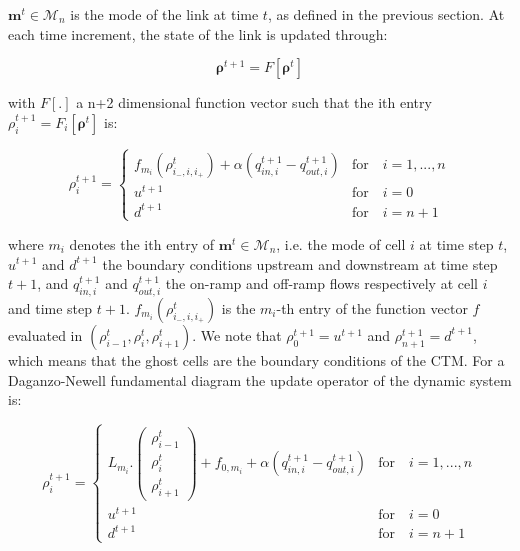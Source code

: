 \documentclass[11pt]{article}
\numberwithin{equation}{section}
\numberwithin{figure}{section}
\numberwithin{table}{section}
\begin{document}
\hspace{10mm}

$\boldsymbol m^{t}\in\mathcal{M}_{n}$ is the mode of the link at time $t$, as defined in the previous section. At each time increment, the state of the link is updated through:

\begin{equation}
\boldsymbol\rho^{t+1} = F[\boldsymbol\rho^{t}]
\label{eq:underlyingSystem1}
\end{equation}

\noindent with $F[.]$ a n+2 dimensional function vector such that the ith entry $\rho^{t+1}_{i}=F_{i}[\boldsymbol\rho^{t}]$ is:

\begin{equation}
\rho^{t+1}_{i} = \begin{cases}
f_{m_{i}}(\rho^{t}_{i_{-},i,i_{+}}) + \alpha(q^{t+1}_{in,i}-q^{t+1}_{out,i}) & \text{for}\quad i=1,...,n\\
u^{t+1} & \text{for}\quad i=0\\
d^{t+1} & \text{for}\quad i=n+1
\end{cases}
\label{eq:underlyingSystem2}
\end{equation}

\noindent where $m_{i}$ denotes the ith entry of $\boldsymbol m^{t} \in\mathcal{M}_{n}$, i.e. the mode of cell $i$ at time step $t$, $u^{t+1}$ and $d^{t+1}$ the boundary conditions upstream and downstream at time step $t+1$, and $q^{t+1}_{in,i}$ and $q^{t+1}_{out,i}$ the on-ramp and off-ramp flows respectively at cell $i$ and time step $t+1$. $f_{m_{i}}(\rho^{t}_{i_{-},i,i_{+}})$ is the $m_{i}$-th entry of the function vector $f$ evaluated in $(\rho^{t}_{i-1},\rho^{t}_{i},\rho^{t}_{i+1})$. We note that $\rho^{t+1}_{0}=u^{t+1}$ and $\rho^{t+1}_{n+1}=d^{t+1}$, which means that the ghost cells are the boundary conditions of the CTM. For a Daganzo-Newell fundamental diagram the update operator of the dynamic system is:

\begin{equation}
\rho^{t+1}_{i} = \begin{cases}
L_{m_{i}}.\left( \begin{array}{c}
\rho^{t}_{i-1}\\
\rho^{t}_{i}\\
\rho^{t}_{i+1}
\end{array} \right)
+ f_{0,m_{i}} + \alpha(q^{t+1}_{in,i}-q^{t+1}_{out,i}) & \text{for}\quad i=1,...,n\\
u^{t+1} & \text{for}\quad i=0\\
d^{t+1} & \text{for}\quad i=n+1
\end{cases}
\label{eq:underlyingSystemDN}
\end{equation}
\end{document}
